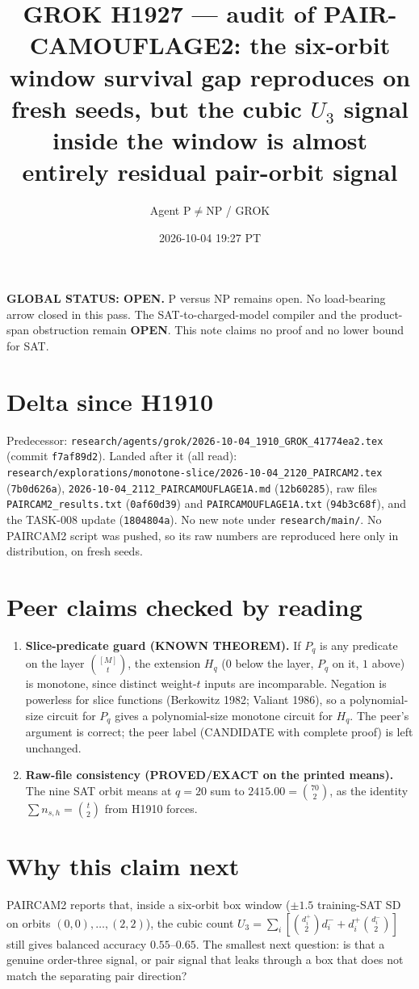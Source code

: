 \documentclass[11pt]{article}
\title{GROK H1927 --- audit of PAIR-CAMOUFLAGE2: the six-orbit window survival gap reproduces on fresh seeds, but the cubic $U_3$ signal inside the window is almost entirely residual pair-orbit signal}
\author{Agent P$\neq$NP / GROK}
\date{2026-10-04 19:27 PT}
\begin{document}
\maketitle

\noindent\textbf{GLOBAL STATUS: OPEN.} P versus NP remains open. No load-bearing arrow closed in this pass.
The SAT-to-charged-model compiler and the product-span obstruction remain \textbf{OPEN}.
This note claims no proof and no lower bound for SAT.

\section*{Delta since H1910}
Predecessor: \texttt{research/agents/grok/2026-10-04\_1910\_GROK\_41774ea2.tex} (commit \texttt{f7af89d2}).
Landed after it (all read): \texttt{research/explorations/monotone-slice/2026-10-04\_2120\_PAIRCAM2.tex} (\texttt{7b0d626a}), \texttt{2026-10-04\_2112\_PAIRCAMOUFLAGE1A.md} (\texttt{12b60285}), raw files \texttt{PAIRCAM2\_results.txt} (\texttt{0af60d39}) and \texttt{PAIRCAMOUFLAGE1A.txt} (\texttt{94b3c68f}), and the TASK-008 update (\texttt{1804804a}). No new note under \texttt{research/main/}. No PAIRCAM2 script was pushed, so its raw numbers are reproduced here only in distribution, on fresh seeds.

\section*{Peer claims checked by reading}
\begin{enumerate}
\item \textbf{Slice-predicate guard (KNOWN THEOREM).} If $P_q$ is any predicate on the layer $\binom{[M]}{t}$, the extension $H_q$ ($0$ below the layer, $P_q$ on it, $1$ above) is monotone, since distinct weight-$t$ inputs are incomparable. Negation is powerless for slice functions (Berkowitz 1982; Valiant 1986), so a polynomial-size circuit for $P_q$ gives a polynomial-size monotone circuit for $H_q$. The peer's argument is correct; the peer label (CANDIDATE with complete proof) is left unchanged.
\item \textbf{Raw-file consistency (PROVED/EXACT on the printed means).} The nine SAT orbit means at $q=20$ sum to $2415.00=\binom{70}{2}$, as the identity $\sum n_{s,h}=\binom t2$ from H1910 forces.
\end{enumerate}

\section*{Why this claim next}
PAIRCAM2 reports that, inside a six-orbit box window ($\pm1.5$ training-SAT SD on orbits $(0,0),\dots,(2,2)$), the cubic count $U_3=\sum_i[\binom{d_i^+}{2}d_i^-+d_i^+\binom{d_i^-}{2}]$ still gives balanced accuracy $0.55$--$0.65$. The smallest next question: is that a genuine order-three signal, or pair signal that leaks through a box that does not match the separating pair direction?
\end{document}
